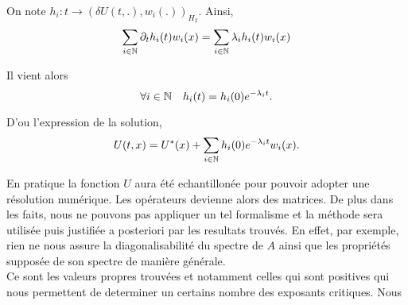 \documentclass[10pt]{article}
\begin{document}
\begin{multicols}{2}
On note $h_i : t \rightarrow (\delta U(t, .),  w_i(.))_{H_2}$. Ainsi,
\begin{equation}
  \sum_{i\in\mathbb{N}} \partial_t h_i(t) w_i(x) = \sum_{i\in\mathbb{N}} \lambda_i  h_i(t) w_i(x)
\end{equation}

Il vient alors 
\begin{equation}
  \forall i \in \mathbb{N} \quad h_i(t) = h_i(0) e^{-\lambda_i t}.
\end{equation}

D'ou l'expression de la solution, 
\begin{equation}
  U(t,x) = U^*(x) + \sum_{i\in \mathbb{N}} h_i(0)e^{-\lambda_i t}w_i(x).
\end{equation}


En pratique la fonction $U$ aura été echantillonée pour pouvoir adopter une résolution numérique. Les opérateurs devienne alors des matrices. De plus dans les faits, nous ne pouvons pas appliquer un tel formalisme et la méthode sera utilisée puis justifiée a posteriori par les resultats trouvés. En effet, par exemple, rien ne nous assure la diagonalisabilité du spectre de $A$ ainsi que les propriétés supposée de son spectre de manière générale.\\

Ce sont les valeurs propres trouvées et notamment celles qui sont positives qui nous permettent de determiner un certains nombre des exposants critiques. Nous


\end{multicols}
\end{document}
